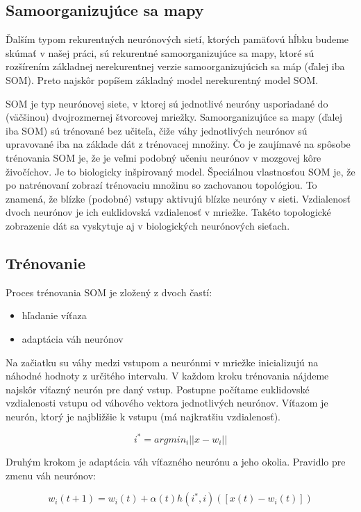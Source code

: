 \subsection{Samoorganizujúce sa mapy}
Ďalším typom rekurentných neurónových sietí, ktorých pamäťovú hĺbku budeme 
skúmať v našej práci, sú rekurentné samoorganizujúce sa mapy, 
ktoré sú rozšírením základnej nerekurentnej verzie samoorganizujúcich sa máp (ďalej iba SOM). 
Preto najskôr popíšem základný model nerekurentný model SOM.

SOM je typ neurónovej siete, v ktorej sú jednotlivé neuróny usporiadané do (väčšinou) dvojrozmernej štvorcovej mriežky. Samoorganizujúce sa mapy (ďalej iba SOM) sú trénované bez učiteľa, čiže váhy jednotlivých neurónov sú upravované iba na základe dát z trénovacej množiny. 
Čo je zaujímavé na spôsobe trénovania SOM je, že je veľmi podobný učeniu neurónov v mozgovej kôre živočíchov. Je to biologicky inšpirovaný model.
Špeciálnou vlastnosťou SOM je, že po natrénovaní zobrazí trénovaciu množinu so zachovanou topológiou. To znamená, že blízke (podobné) vstupy aktivujú blízke neuróny v sieti. Vzdialenosť dvoch neurónov je ich euklidovská vzdialenosť v mriežke. Takéto topologické zobrazenie dát sa vyskytuje aj v biologických neurónových sieťach.

\subsection{Trénovanie}
Proces trénovania SOM je zložený z dvoch častí:
\begin{itemize}
\item hľadanie víťaza
\item adaptácia váh neurónov
\end{itemize}
Na začiatku su váhy medzi vstupom a neurónmi v mriežke inicializujú na náhodné hodnoty z určitého intervalu.
V každom kroku trénovania nájdeme najskôr víťazný neurón pre daný vstup. Postupne počítame euklidovské vzdialenosti vstupu od váhového vektora jednotlivých neurónov. Víťazom je neurón, ktorý je najbližšie k vstupu (má najkratšiu vzdialenosť).

\begin{equation}
i^* = argmin_i||x-w_i|| 
\end{equation}

Druhým krokom je adaptácia váh víťazného neurónu a jeho okolia. Pravidlo pre zmenu váh neurónov:

\begin{equation}
w_i(t+1) = w_i(t) + \alpha(t)h(i^*, i)([x(t) - w_i(t)])
\end{equation}

